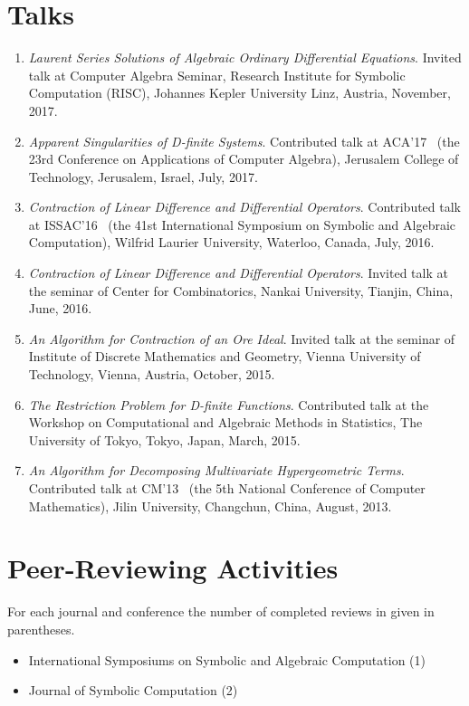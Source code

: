 \documentclass[a4paper,12pt]{article}
\begin{document}
\section*{\Large{Talks}}
\begin{enumerate}
 \item {\em Laurent Series Solutions of Algebraic Ordinary Differential Equations}. 
 Invited talk at Computer Algebra Seminar, Research Institute for Symbolic Computation (RISC), Johannes Kepler University Linz, 
 Austria, November, 2017.
 \item {\em Apparent Singularities of D-finite Systems}. Contributed talk at ACA'17 
 \ (the 23rd Conference on Applications of Computer Algebra), Jerusalem College of Technology, Jerusalem, Israel, July, 2017.
 \item {\em Contraction of Linear Difference and Differential Operators}. Contributed talk at ISSAC'16 
 \ (the 41st International Symposium on Symbolic and Algebraic Computation), Wilfrid Laurier University, Waterloo, Canada, July, 2016.
 \item {\em Contraction of Linear Difference and Differential Operators}.
       Invited talk at the seminar of Center for Combinatorics, Nankai University, Tianjin, China, June, 2016.
 \item {\em An Algorithm for Contraction of an Ore Ideal}. Invited talk at the seminar of Institute of Discrete Mathematics and Geometry, 
       Vienna University of Technology, Vienna, Austria, October, 2015.
 \item {\em The Restriction Problem for D-finite Functions}. 
       Contributed talk at the Workshop on Computational and Algebraic Methods in Statistics,
       The University of Tokyo, Tokyo, Japan, March, 2015.
 \item {\em An Algorithm for Decomposing Multivariate Hypergeometric Terms}. Contributed talk at CM'13
       \ (the 5th National Conference of Computer Mathematics), Jilin University, Changchun, China, August, 2013.
\end{enumerate}

\section*{\Large Peer-Reviewing Activities}
For each journal and conference the number of completed reviews in given in parentheses.
\begin{itemize}
 \item International Symposiums on Symbolic and Algebraic Computation (1)
 \item Journal of Symbolic Computation (2)
\end{itemize}
\end{document}
